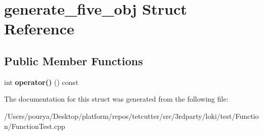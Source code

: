 \hypertarget{structgenerate__five__obj}{}\section{generate\+\_\+five\+\_\+obj Struct Reference}
\label{structgenerate__five__obj}
\subsection*{Public Member Functions}
\begin{DoxyCompactItemize}
\item 
\hypertarget{structgenerate__five__obj_a2b1898b388bc9fc6b57d11112d015105}{}int {\bfseries operator()} () const \label{structgenerate__five__obj_a2b1898b388bc9fc6b57d11112d015105}

\end{DoxyCompactItemize}


The documentation for this struct was generated from the following file\+:\begin{DoxyCompactItemize}
\item 
/\+Users/pourya/\+Desktop/platform/repos/tetcutter/src/3rdparty/loki/test/\+Function/Function\+Test.\+cpp\end{DoxyCompactItemize}
